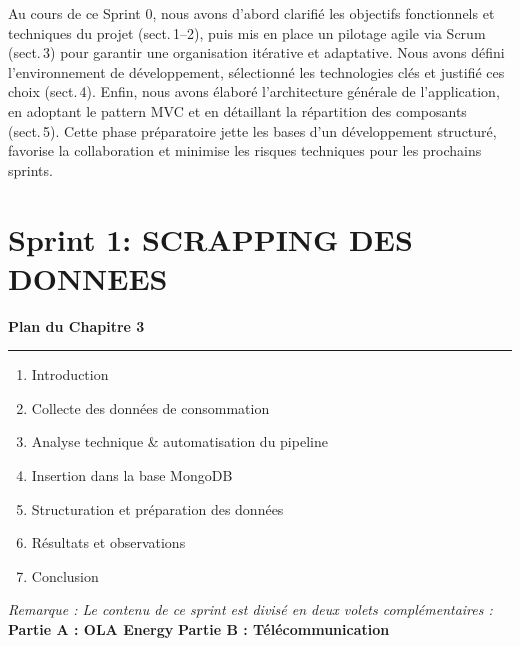 \documentclass[a4paper,11pt]{report}
\begin{document}
Au cours de ce Sprint 0, nous avons d’abord clarifié les objectifs fonctionnels et techniques du projet (sect. 1–2), puis mis en place un pilotage agile via Scrum (sect. 3) pour garantir une organisation itérative et adaptative. Nous avons défini l’environnement de développement, sélectionné les technologies clés et justifié ces choix (sect. 4). Enfin, nous avons élaboré l’architecture générale de l’application, en adoptant le pattern MVC et en détaillant la répartition des composants (sect. 5). Cette phase préparatoire jette les bases d’un développement structuré, favorise la collaboration et minimise les risques techniques pour les prochains sprints.


\newpage

\chapter{Sprint 1: SCRAPPING DES DONNEES}

\vspace*{2cm}

\begin{center}
    {\LARGE \textbf{Plan du Chapitre 3}}
\end{center}

\vspace{1cm}

\noindent
\textcolor{gray!70}{\rule{\textwidth}{0.4pt}}

\vspace{1cm}

\begin{enumerate}[label=\textbf{\large\arabic*.}, leftmargin=*, itemsep=1.2em]
    \item Introduction
    \item Collecte des données de consommation
    \item Analyse technique \& automatisation du pipeline
    \item Insertion dans la base MongoDB
    \item Structuration et préparation des données
    \item Résultats et observations
    \item Conclusion
\end{enumerate}

\vspace{0.5cm}

\noindent
\textit{\large Remarque : Le contenu de ce sprint est divisé en deux volets complémentaires :} \\
\textbf{\large Partie A : OLA Energy} \hfill \textbf{\large Partie B : Télécommunication}
\end{document}
